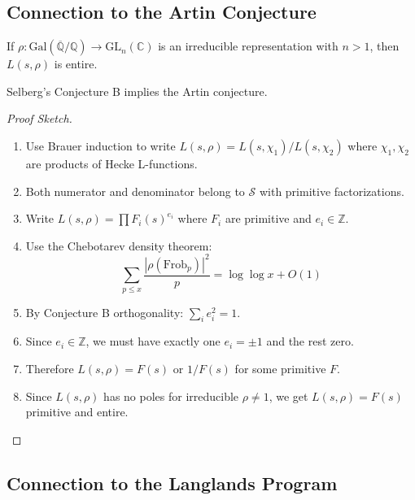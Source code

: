 \subsection{Connection to the Artin Conjecture}

\begin{conjecture}
If $\rho: \text{Gal}(\overline{\mathbb{Q}}/\mathbb{Q}) \to \text{GL}_n(\mathbb{C})$ is an irreducible representation with $n > 1$, then $L(s,\rho)$ is entire.
\end{conjecture}

\begin{theorem}
Selberg's Conjecture B implies the Artin conjecture.
\end{theorem}

\begin{proof}[Proof Sketch]
\begin{enumerate}
\item Use Brauer induction to write $L(s,\rho) = L(s,\chi_1)/L(s,\chi_2)$ where $\chi_1, \chi_2$ are products of Hecke L-functions.

\item Both numerator and denominator belong to $\mathcal{S}$ with primitive factorizations.

\item Write $L(s,\rho) = \prod F_i(s)^{e_i}$ where $F_i$ are primitive and $e_i \in \mathbb{Z}$.

\item Use the Chebotarev density theorem:
   \begin{equation}
   \sum_{p \leq x} \frac{|\rho(\text{Frob}_p)|^2}{p} = \log \log x + O(1)
   \end{equation}

\item By Conjecture B orthogonality: $\sum_i e_i^2 = 1$.

\item Since $e_i \in \mathbb{Z}$, we must have exactly one $e_i = \pm 1$ and the rest zero.

\item Therefore $L(s,\rho) = F(s)$ or $1/F(s)$ for some primitive $F$.

\item Since $L(s,\rho)$ has no poles for irreducible $\rho \neq 1$, we get $L(s,\rho) = F(s)$ primitive and entire.
\end{enumerate}
\end{proof}

\subsection{Connection to the Langlands Program}

